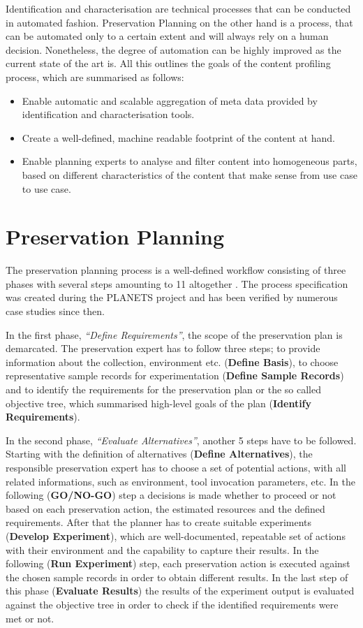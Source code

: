 Identification and characterisation are technical processes that can be conducted in automated fashion. Preservation Planning on the other hand is a process, that can be automated only to a certain extent and will always rely on a human decision. Nonetheless, the degree of automation can be highly improved as the current state of the art is. All this outlines the goals of the content profiling process, which are summarised as follows:

\begin{itemize}
\item Enable automatic and scalable aggregation of meta data provided by identification and characterisation tools.
\item Create a well-defined, machine readable footprint of the content at hand.
\item Enable planning experts to analyse and filter content into homogeneous parts, based on different characteristics of the content that make sense from use case to use case.
\end{itemize}

\section{Preservation Planning}
The preservation planning process is a well-defined workflow consisting of three phases with several steps amounting to 11 altogether \cite{STR07_jcdl}. The process specification was created during the PLANETS project and has been verified by numerous case studies since then. 

In the first phase, \textit{``Define Requirements''}, the scope of the preservation plan is demarcated. The preservation expert has to follow three steps; to provide information about the collection, environment etc. (\textbf{Define Basis}), to choose representative sample records for experimentation (\textbf{Define Sample Records}) and to identify the requirements for the preservation plan or the so called objective tree, which summarised high-level goals of the plan (\textbf{Identify Requirements}). 

In the second phase, \textit{``Evaluate Alternatives''}, another 5 steps have to be followed. Starting with the definition of alternatives (\textbf{Define Alternatives}), the responsible preservation expert has to choose a set of potential actions, with all related informations, such as environment, tool invocation parameters, etc. In the following (\textbf{GO/NO-GO}) step a decisions is made whether to proceed or not based on each preservation action, the estimated resources and the defined requirements. After that the planner has to create suitable experiments (\textbf{Develop Experiment}), which are well-documented, repeatable set of actions with their environment and the capability to capture their results. In the following (\textbf{Run Experiment}) step, each preservation action is executed against the chosen sample records in order to obtain different results. In the last step of this phase (\textbf{Evaluate Results}) the results of the experiment output is evaluated against the objective tree in order to check if the identified requirements were met or not.

